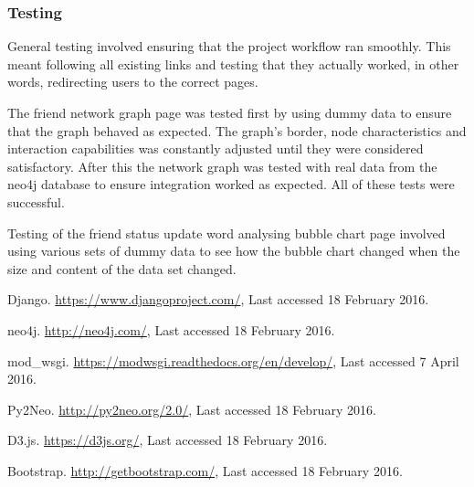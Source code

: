 \documentclass[10pt,onecolumn]{article}
\begin{document}
\subsubsection{Testing}

General testing involved ensuring that the project workflow ran smoothly. This meant following all existing links and testing that they actually worked, in other words, redirecting users to the correct pages.

The friend network graph page was tested first by using dummy data to ensure that the graph behaved as expected. The graph's border, node characteristics and interaction capabilities was constantly adjusted until they were considered satisfactory. After this the network graph was tested with real data from the neo4j database to ensure integration worked as expected. All of these tests were successful.

Testing of the friend status update word analysing bubble chart page involved using various sets of dummy data to see how the bubble chart changed when the size and content of the data set changed.

\begin{thebibliography}{1}

  Django. \url{https://www.djangoproject.com/}, Last accessed 18 February 2016.

 neo4j. \url{http://neo4j.com/}, Last accessed 18 February 2016.

 mod\_wsgi. \url{https://modwsgi.readthedocs.org/en/develop/}, Last accessed 7 April 2016.

 Py2Neo. \url{http://py2neo.org/2.0/}, Last accessed 18 February 2016.

 D3.js. \url{https://d3js.org/}, Last accessed 18 February 2016.

 Bootstrap. \url{http://getbootstrap.com/}, Last accessed 18 February 2016.
	
\end{thebibliography}

\clearpage
\end{document}

